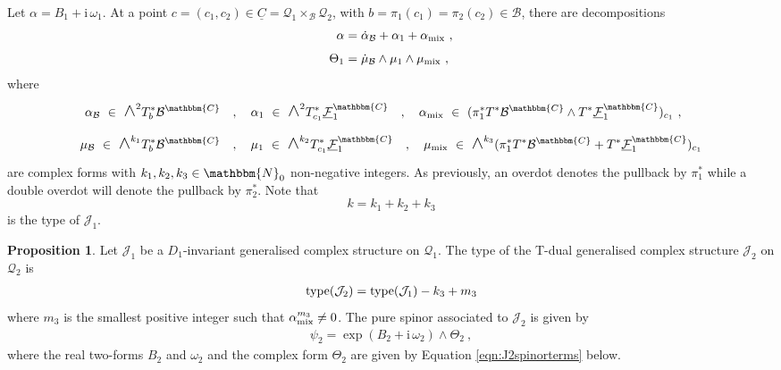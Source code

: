 \documentclass[a4paper, reqno, 11pt]{amsart}
\numberwithin{equation}{section}
\theoremstyle{definition}
\newtheorem{proposition}[equation]{Proposition}
\newcommand{\red}[1]{\underline{#1}}
\newcommand{\ii}{\mathrm{i}}
\newcommand{\IC}{\mathbbm{C}}
\newcommand{\IN}{\mathbbm{N}}
\newcommand{\cB}{{\mathcal B}}
\newcommand{\cQ}{{\mathcal Q}}
\newcommand{\cF}{{\mathcal F}}
\newcommand{\cJ}{{\mathcal J}}
\newcommand{\midwedge}{\text {\Large$\wedge$}}
\theoremstyle{remark}
\begin{document}
Let $\alpha = B_1 + \ii\,\omega_1$. At a point $c=(c_1,c_2) \in \red C=\cQ_1\times_\cB\cQ_2$, with $b=\pi_1(c_1)=\pi_2(c_2)\in\cB$, there are decompositions
\begin{align}
    \alpha &= \dot \alpha_\cB + \alpha_1 + \alpha_{\rm mix} \ ,\\[4pt]
    \Theta_1 &= \dot\mu_\cB \wedge \mu_1 \wedge \mu_{\rm mix} \ ,
\end{align}
where 
\begin{align}
    \begin{split}
\alpha_\cB \ \in \ \midwedge^2 T_b^*\cB^\IC & \quad , \quad \alpha_1 \ \in \ \midwedge^2 T_{c_1}^*\red\cF{}_1^\IC \quad , \quad \alpha_{\rm mix} \ \in \ ( \pi_1^* T^*\cB^\IC\wedge T^*\red\cF{}_1^\IC)_{c_1} \ , \\[4pt] \mu_{\cB} \ \in \ \midwedge^{k_1} T_b^*\cB^\IC & \quad , \quad \mu_1 \ \in \ \midwedge^{k_2} T_{c_1}^*\red\cF{}_1^\IC \quad , \quad \mu_{\rm mix} \ \in \ \midwedge^{k_3} (\pi_1^*T^*\cB^\IC + T^*\red\cF{}_1^\IC)_{c_1}
\end{split}
\end{align}
are complex forms with $k_1,k_2,k_3\in\IN_0$ non-negative integers. As previously, an overdot denotes the pullback by $\pi_1^*$ while a double overdot will denote the pullback by $\pi_2^*$. Note that $$k = k_1 + k_2 + k_3$$ is the type of $\cJ_1$.

\begin{proposition}\label{prop:Tdualspinor}
Let $\cJ_1$ be a $D_1$-invariant generalised complex structure on $\cQ_1$. The type of the T-dual generalised complex structure $\cJ_2$ on $\cQ_2$ is
\begin{align}\label{eqn:J2type}
    {\rm type}(\cJ_2) = {\rm type}(\cJ_1) - k_3 + m_3 
\end{align} 
where $m_3$ is the smallest positive integer such that $\alpha_{\rm mix}^{m_3} \neq 0$.
The pure spinor associated to $\cJ_2$ is given by
\begin{align}\label{eqn:J2decomp}
    \psi_{2} = \exp(B_2 + \ii\, \omega_2) \wedge \Theta_2 \ ,
\end{align}
where the real two-forms $B_2$ and $\omega_2$ and the complex form $\Theta_2$ are given by Equation \eqref{eqn:J2spinorterms} below.
\end{proposition}
\end{document}
